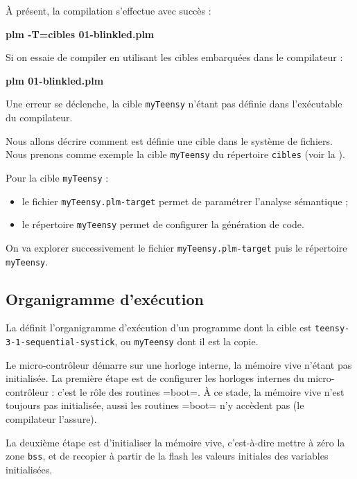 À présent, la compilation s'effectue avec succès :
\begin{SHELL}
\bfseries plm -T=cibles 01-blinkled.plm
\end{SHELL}

Si on essaie de compiler en utilisant les cibles embarquées dans le compilateur :
\begin{SHELL}
\bfseries plm 01-blinkled.plm
\end{SHELL}

Une erreur se déclenche, la cible \texttt{myTeensy} n'étant pas définie dans l'exécutable du compilateur.







Nous allons décrire comment est définie une cible dans le système de fichiers. Nous prenons comme exemple la cible \texttt{myTeensy} du répertoire \texttt{cibles} (voir la ).

Pour la cible \texttt{myTeensy} :
\begin{itemize}
  \item le fichier \texttt{myTeensy.plm-target} permet de paramétrer l'analyse sémantique ;
  \item le répertoire \texttt{myTeensy} permet de configurer la génération de code.
\end{itemize}

On va explorer successivement le fichier \texttt{myTeensy.plm-target} puis le répertoire \texttt{myTeensy}.

\subsection{Organigramme d'exécution}

La  définit l'organigramme d'exécution d'un programme dont la cible est \texttt{teensy-3-1-sequential-systick}, ou \texttt{myTeensy} dont il est la copie.

Le micro-contrôleur démarre sur une horloge interne, la mémoire vive n'étant pas initialisée. La première étape est de configurer les horloges internes du micro-contrôleur : c'est le rôle des routines \plm=boot=. À ce stade, la mémoire vive n'est toujours pas initialisée, aussi les routines \plm=boot= n'y accèdent pas (le compilateur l'assure).

La deuxième étape est d'initialiser la mémoire vive, c'est-à-dire mettre à zéro la zone \texttt{bss}, et de recopier à partir de la flash les valeurs initiales des variables initialisées.


